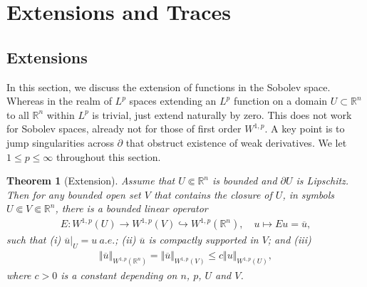 \documentclass{article}
\numberwithin{equation}{section}
\newcommand{\bbR}{\mathbb{R}}
\newcommand{\ol}{\overline}
\theoremstyle{plain}
\newtheorem{theorem}{Theorem}[section]
\theoremstyle{definition}
\begin{document}
\newpage
\section{Extensions and Traces}
\subsection{Extensions}
In this section, we discuss the extension of functions in the Sobolev space. Whereas in the realm of $L^p$ spaces extending an $L^p$ function on a domain $U\subset\bbR^n$ to all $\bbR^n$ within $L^p$ is trivial, just extend naturally by zero. This does not work for Sobolev spaces, already not for those of first order $W^{1,p}$. A key point is to jump singularities across $\partial$ that obstruct existence of weak derivatives. We let $1\leq p\leq\infty$ throughout this section.
\begin{theorem}[Extension]\label{sobolevextension}
Assume that $U\Subset\bbR^n$ is bounded and $\partial U$ is Lipschitz. Then for any bounded open set $V$ that contains the closure of $U$, in symbols $U\Subset V\Subset\bbR^n$, there is a bounded linear operator
\begin{align*}
	E:W^{1,p}(U)\to W^{1,p}(V)\hookrightarrow W^{1,p}(\bbR^n),\quad u\mapsto Eu=\ol{u},
\end{align*}
such that (i) $\ol{u}|_U=u\ a.e.$; (ii) $\ol{u}$ is compactly supported in $V$; and (iii)
\begin{align}
	\Vert\ol{u}\Vert_{W^{1,p}(\bbR^n)}=\Vert\ol{u}\Vert_{W^{1,p}(V)}\leq c\Vert u\Vert_{W^{1,p}(U)}, \label{consext}
\end{align}
where $c>0$ is a constant depending on $n$, $p$, $U$ and $V$.
\end{theorem}
\end{document}
